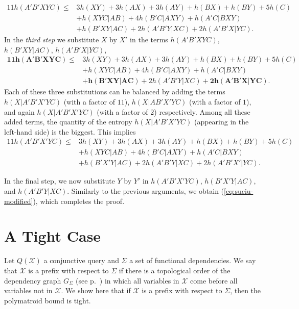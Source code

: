 \documentclass[a4paper,cleveref]{lipics-v2021}
\newcommand{\vset}[1]{\mathcal{#1}}
\begin{document}
\begin{align}\label{eq:suciu3}
	11 h(A'B'XYC) \le &3 h(XY) + 3h(AX) + 3h(AY) +h(BX) + h(BY) + 5h(C) \nonumber \\
	& + h(XYC|AB) + 4h(B'C|AXY) + h(A'C|BXY) \nonumber \\&+ h(B'XY|AC)+ 2h(A'B'Y|XC) + 2h(A'B'X|YC).
\end{align}
In the \emph{third step} 
we substitute $X$ by $X'$ in the terms $h(A'B'XYC)$, $h(B'XY|AC)$, $h(A'B'X|YC)$,
%
\begin{align}
	\bm{11 h(A'B'XYC)} \le &3 h(XY) + 3h(AX) + 3h(AY) +h(BX) + h(BY) + 5h(C) \nonumber \\
	& + h(XYC|AB) + 4h(B'C|AXY) + h(A'C|BXY) \nonumber \\&
	+ \bm{h(B'XY|AC)}+ 2h(A'B'Y|XC) + \bm{2h(A'B'X|YC)}. \nonumber
\end{align}
%
Each of these three substitutions can be balanced by adding the terms $h(X|A'B'X'YC)$ (with a factor of $11$), $h(X|AB'X'YC)$ (with a factor of $1$), and again $h(X|A'B'X'YC)$ (with a factor of $2$)
respectively.
Among all these added terms,  the quantity of the entropy $h(X|A'B'X'YC)$ (appearing in  the left-hand side) is the biggest. 
This implies 
\begin{align}
	11 h(A'B'X'YC) \le &3 h(XY) + 3h(AX) + 3h(AY) +h(BX) + h(BY) + 5h(C) \nonumber \\
	& + h(XYC|AB) + 4h(B'C|AXY) + h(A'C|BXY) \nonumber \\&+ h(B'X'Y|AC)+ 2h(A'B'Y|XC) + 2h(A'B'X'|YC).\label{eq:suciu4} 
\end{align}

In the final step, we now substitute $Y$ by $Y'$ in $h(A'B'X'YC)$, $h(B'X'Y|AC)$, and $h(A'B'Y|XC)$. 
Similarly to the previous arguments, we obtain (\ref{eq:suciu-modified}), which completes the proof.

\section{A Tight Case}

Let $Q(\vset X)$ a conjunctive query and $\Sigma$ a set of functional dependencies. We say that $\vset X$ is a prefix with respect to $\Sigma$ if there is a topological order
of the dependency graph $G_\Sigma$ (see p.~\pageref{directed-graph}) in which all variables in $\vset X$ come before all variables not in $\vset X$. We show here that if $\vset X$ is a prefix with respect to $\Sigma$, then the polymatroid bound is tight.
\end{document}
